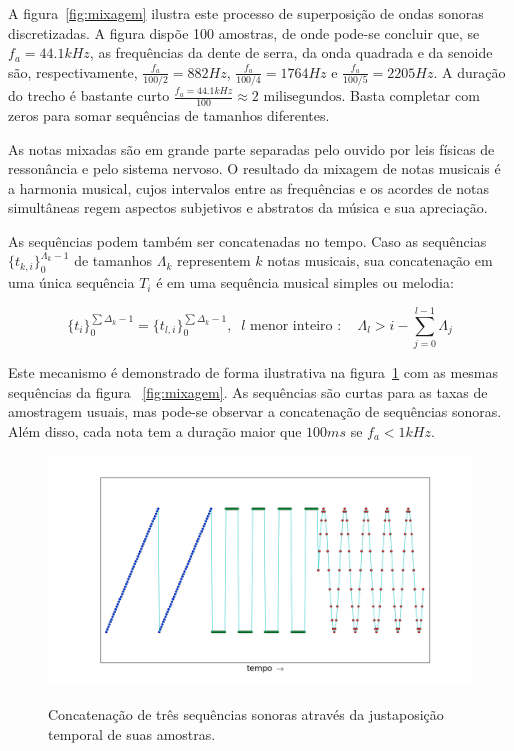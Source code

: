 A figura~\ref{fig:mixagem} ilustra este processo de superposição de ondas sonoras discretizadas. A figura dispõe 100 amostras, de onde pode-se concluir que, se $f_a=44.1kHz$, as frequências da dente de serra, da onda quadrada e da senoide são,
respectivamente, $\frac{f_a}{100/2}=882Hz$, $\frac{f_a}{100/4}=1764Hz$ e $\frac{f_a}{100/5}=2205Hz$. A duração do trecho é bastante curto $\frac{f_a=44.1kHz}{100} \approx 2 \text{ milisegundos}$. Basta completar com zeros para somar sequências de tamanhos diferentes. 

As notas mixadas são em grande parte separadas pelo ouvido por leis físicas de ressonância e pelo sistema nervoso.\cite{Roederer} O resultado da mixagem de notas musicais é a harmonia musical, cujos intervalos entre as frequências e os acordes de notas simultâneas regem aspectos subjetivos e abstratos da música e sua apreciação.\cite{Harmonia} 

As sequências podem também ser concatenadas no tempo. Caso as sequências $\{t_{k,i}\}_0^{\Lambda_k-1}$ de tamanhos $\Lambda_k$  representem $k$ notas musicais, sua concatenação em uma única sequência $T_i$ é em uma sequência musical simples ou melodia:

\begin{equation}\label{eq:concatenacao}
\{t_i\}_0^{\sum\Delta_k-1}=\{t_{l,i}\}_0^{\sum\Delta_k-1}, \;\; l\text{ menor inteiro } : \quad \Lambda_l > i -\sum_{j=0}^{l-1}\Lambda_j
\end{equation}

Este mecanismo é demonstrado de forma ilustrativa na figura~\ref{fig:concatenacao} com as mesmas sequências da figura ~\ref{fig:mixagem}.
 As sequências são curtas para as taxas de amostragem usuais, mas pode-se observar a concatenação de sequências sonoras. Além disso, cada nota tem a duração maior que $100ms$ se $f_a<1kHz$.

\begin{figure}[h!]
{    \centering
        \includegraphics[width=\textwidth]{figuras/concatenacao}}
    \caption{Concatenação de três sequências sonoras através da justaposição temporal de suas amostras.}
        \label{fig:concatenacao}
\end{figure}

